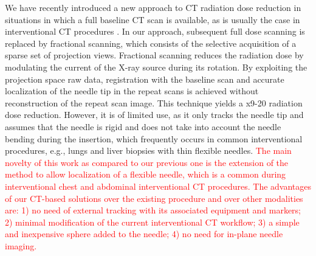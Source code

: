We have recently introduced a new approach to CT radiation dose reduction in situations in which a full baseline CT scan is available, as is usually the case in interventional CT procedures \cite{medan2017sparse, medan2017reduced}. In our approach, subsequent full dose scanning is replaced by fractional scanning, which consists of the selective acquisition of a sparse set of projection views. Fractional scanning reduces the radiation dose by modulating the current of the X-ray source during its rotation. By exploiting the projection space raw data, registration with the baseline scan and accurate localization of the needle tip in the repeat scans is achieved without reconstruction of the repeat scan  image. This technique yields a x9-20 radiation dose reduction. However, it is of limited use, as it only tracks the needle tip and assumes that the needle is rigid and does not take into account the needle bending during the insertion, which frequently occurs in common interventional procedures, e.g., lungs and liver biopsies with thin flexible needles. \textcolor{red}{The main novelty of this work as compared to our previous one \cite{medan2017reduced} is the extension of the method to allow localization of a flexible needle, which is a common during interventional chest and abdominal interventional CT procedures. The advantages of our CT-based solutions over the existing procedure and over other modalities are: 1) no need of external tracking with its associated equipment and markers; 2) minimal modification of the current interventional CT workflow; 3) a simple and inexpensive sphere added to the needle; 4) no need for in-plane needle imaging.}

